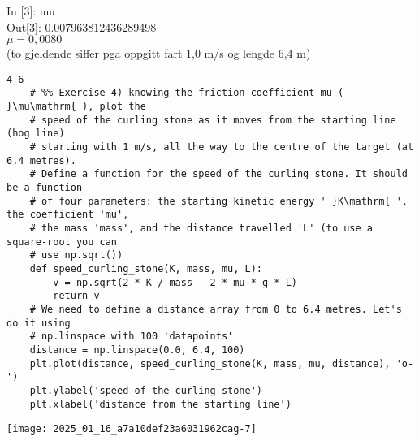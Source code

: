 \documentclass[10pt]{article}
\begin{document}
In [3]: mu\\[0pt]
Out[3]: 0.007963812436289498\\
$\mu=0,0080$\\
(to gjeldende siffer pga oppgitt fart 1,0 m/s og lengde 6,4 m)

\begin{verbatim}
4 6
    # %% Exercise 4) knowing the friction coefficient mu ( }\mu\mathrm{ ), plot the
    # speed of the curling stone as it moves from the starting line (hog line)
    # starting with 1 m/s, all the way to the centre of the target (at 6.4 metres).
    # Define a function for the speed of the curling stone. It should be a function
    # of four parameters: the starting kinetic energy ' }K\mathrm{ ', the coefficient 'mu',
    # the mass 'mass', and the distance travelled 'L' (to use a square-root you can
    # use np.sqrt())
    def speed_curling_stone(K, mass, mu, L):
        v = np.sqrt(2 * K / mass - 2 * mu * g * L)
        return v
    # We need to define a distance array from 0 to 6.4 metres. Let's do it using
    # np.linspace with 100 'datapoints'
    distance = np.linspace(0.0, 6.4, 100)
    plt.plot(distance, speed_curling_stone(K, mass, mu, distance), 'o-')
    plt.ylabel('speed of the curling stone')
    plt.xlabel('distance from the starting line')
\end{verbatim}

\begin{center}
\texttt{[image: 2025\_01\_16\_a7a10def23a6031962cag-7]}
\end{center}
\end{document}
